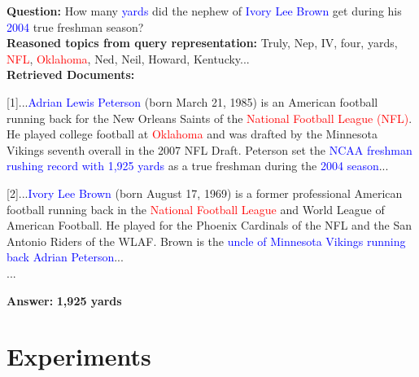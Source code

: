 \documentclass{applemlr}
\numberwithin{equation}{section}
\begin{document}
\begin{table}[!htbp]
  \centering
  \scriptsize
\begin{tcolorbox}[
    colback=gray!3,      
    colframe=gray!40,   
    arc=2mm,             
    boxrule=0.4pt,       
    left=3mm, right=3mm, top=2mm, bottom=2mm,
    width=\linewidth,
    title=\textbf{Analysis of Decoded Tokens from Query Reasoner via Logit Lens},
    coltitle=black,
    fonttitle=\bfseries,
]
\scriptsize


\textbf{Question:} How many \textcolor{blue}{yards} did the nephew of \textcolor{blue}{Ivory Lee Brown} get during his \textcolor{blue}{2004} true freshman season? \\[3pt]
\textbf{Reasoned topics from query representation:}  
Truly, Nep, IV, four, yards, \textcolor{red}{NFL}, \textcolor{red}{Oklahoma}, Ned, Neil, Howard, Kentucky... \\[3pt]
\textbf{Retrieved Documents:} 

[1]...\textcolor{blue}{Adrian Lewis Peterson} (born March 21, 1985) is an American football running back for the New Orleans Saints of the \textcolor{red}{National Football League (NFL)}. He played college football at \textcolor{red}{Oklahoma} and was drafted by the Minnesota Vikings seventh overall in the 2007 NFL Draft. Peterson set the \textcolor{blue}{NCAA freshman rushing record with 1,925 yards} as a true freshman during the \textcolor{blue}{2004 season}...

[2]...\textcolor{blue}{Ivory Lee Brown} (born August 17, 1969) is a former professional American football running back in the \textcolor{red}{National Football League} and World League of American Football. He played for the Phoenix Cardinals of the NFL and the San Antonio Riders of the WLAF. Brown is the \textcolor{blue}{uncle of Minnesota Vikings running back Adrian Peterson}... \\[3pt]
...

\textbf{Answer:} \textbf{1,925 yards}
\end{tcolorbox}
\caption{Analysis of Decoded Tokens from Query Reasoner via Logit Lens. 
The highlighted tokens (\textcolor{red}{red}) denote the new information reasoned by the query reasoner, 
while (\textcolor{blue}{blue}) denotes key evidence for solving this multihop task.}
\label{tab:logit_lens_examples}

\end{table}

\section{Experiments}
\end{document}
